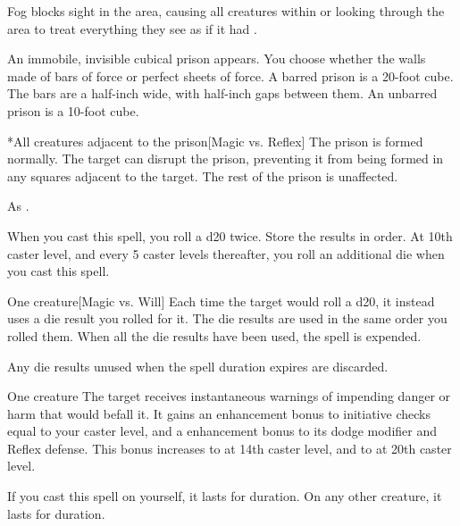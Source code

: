 \spelldur{\durshort}
\spellline
\spelleffect Fog blocks sight in the area, causing all creatures within or looking through the area to treat everything they see as if it had \concealment.
\spellnotes \fogspellnotes \fogwindspellnotes

\spellrng{\rngmed}
\spelldur{\durlong \dismissable}
\spellline
\spelleffect An immobile, invisible cubical prison appears. You choose whether the walls made of bars of force or perfect sheets of force. A barred prison is a 20-foot cube. The bars are a half-inch wide, with half-inch gaps between them. An unbarred prison is a 10-foot cube.
\begin{spelltarget}*{All creatures adjacent to the prison}[Magic vs. Reflex]
    \spellsuccess The prison is formed normally.
    \spellfailure The target can disrupt the prison, preventing it from being formed in any squares adjacent to the target. The rest of the prison is unaffected.
\end{spelltarget}
\spellnotes As .

\spellrng{\rngmed}
\spellspecial When you cast this spell, you roll a d20 twice. Store the results in order. At 10th caster level, and every 5 caster levels thereafter, you roll an additional die when you cast this spell.
\begin{spelltarget}{One creature}[Magic vs. Will]
    \spellsuccess Each time the target would roll a d20, it instead uses a die result you rolled for it. The die results are used in the same order you rolled them. When all the die results have been used, the spell is expended.
\end{spelltarget}
\spellnotes Any die results unused when the spell duration expires are discarded.

\begin{spelltarget}{One creature}
    \spelleffect The target receives instantaneous warnings of impending danger or harm that would befall it. It gains an enhancement bonus to initiative checks equal to your caster level, and a  enhancement bonus to its dodge modifier and Reflex defense. This bonus increases to  at 14th caster level, and to  at 20th caster level.
    \par If you cast this spell on yourself, it lasts for \durlong duration. On any other creature, it lasts for \durshort duration.
\end{spelltarget}

